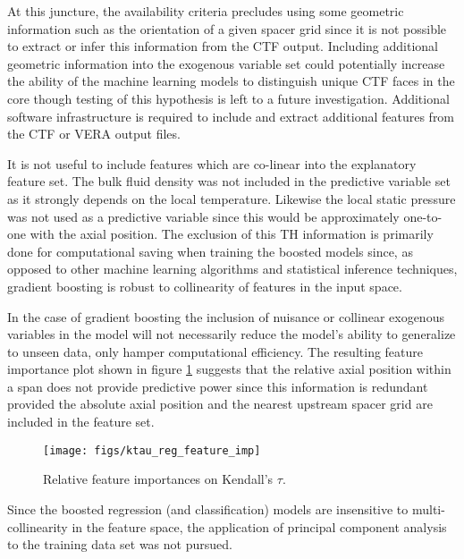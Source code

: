 
At this juncture, the availability criteria precludes using some geometric information such as the orientation of a given spacer grid since it is not possible to extract or infer this information from the CTF output.  Including additional geometric information into the exogenous variable set could potentially increase the ability of the machine learning models to distinguish unique CTF faces in the core though testing of this hypothesis is left to a future investigation.  Additional software infrastructure is required to include and extract additional features from the CTF or VERA output files.

It is not useful to include features which are co-linear into the explanatory feature set. The bulk fluid density was not included in the predictive variable set as it strongly depends on the local temperature. Likewise the local static pressure was not used as a predictive variable since this would be approximately one-to-one with the axial position.  The exclusion of this TH information is primarily done for computational saving when training the boosted models since, as opposed to other machine learning algorithms and statistical inference techniques, gradient boosting is robust to collinearity of features in the input space.

In the case of gradient boosting the inclusion of nuisance or collinear exogenous variables in the model will not necessarily reduce the model's ability to generalize to unseen data, only hamper computational efficiency.  The resulting feature importance plot shown in figure \ref{fig:ktauregfeatureimp} suggests that the relative axial position within a span does not provide predictive power since this information is redundant provided the absolute axial position and the nearest upstream spacer grid are included in the feature set.

\begin{figure}[H]
    \centering
    \texttt{[image: figs/ktau\_reg\_feature\_imp]}
    \caption[Relative feature importance.]{Relative feature importances on Kendall's $\tau$.}
    \label{fig:ktauregfeatureimp}
\end{figure}

Since the boosted regression (and classification) models are insensitive to multi-collinearity in the feature space, the application of principal component analysis to the training data set was not pursued.


